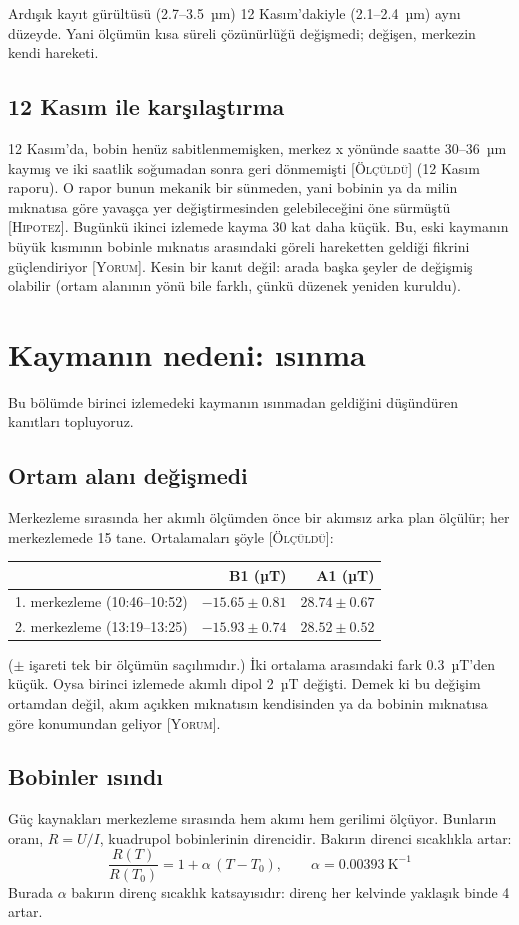 \documentclass[11pt,a4paper]{article}
\newcommand{\olc}{\textsc{[Ölçüldü]}}
\newcommand{\yor}{\textsc{[Yorum]}}
\newcommand{\hip}{\textsc{[Hipotez]}}
\begin{document}
Ardışık kayıt gürültüsü (2.7--3.5~µm) 12 Kasım'dakiyle (2.1--2.4~µm) aynı düzeyde. Yani ölçümün kısa
süreli çözünürlüğü değişmedi; değişen, merkezin kendi hareketi.

\subsection{12 Kasım ile karşılaştırma}
12 Kasım'da, bobin henüz sabitlenmemişken, merkez x yönünde saatte 30--36~µm kaymış ve iki saatlik soğumadan
sonra geri dönmemişti \olc{} (12 Kasım raporu). O rapor bunun mekanik bir sünmeden, yani bobinin ya da milin
mıknatısa göre yavaşça yer değiştirmesinden gelebileceğini öne sürmüştü \hip. Bugünkü ikinci izlemede kayma
30 kat daha küçük. Bu, eski kaymanın büyük kısmının bobinle mıknatıs arasındaki göreli hareketten geldiği
fikrini güçlendiriyor \yor. Kesin bir kanıt değil: arada başka şeyler de değişmiş olabilir (ortam alanının
yönü bile farklı, çünkü düzenek yeniden kuruldu).

\section{Kaymanın nedeni: ısınma}
\label{sec:isinma}

Bu bölümde birinci izlemedeki kaymanın ısınmadan geldiğini düşündüren kanıtları topluyoruz.

\subsection{Ortam alanı değişmedi}
Merkezleme sırasında her akımlı ölçümden önce bir akımsız arka plan ölçülür; her merkezlemede 15 tane.
Ortalamaları şöyle \olc:
\begin{center}\small
\begin{tabular}{lrr}
\toprule
 & B1 (µT) & A1 (µT) \\
\midrule
1. merkezleme (10:46--10:52) & $-15.65 \pm 0.81$ & $28.74 \pm 0.67$ \\
2. merkezleme (13:19--13:25) & $-15.93 \pm 0.74$ & $28.52 \pm 0.52$ \\
\bottomrule
\end{tabular}
\end{center}
($\pm$ işareti tek bir ölçümün saçılımıdır.) İki ortalama arasındaki fark 0.3~µT'den küçük. Oysa birinci
izlemede akımlı dipol 2~µT değişti. Demek ki bu değişim ortamdan değil, akım açıkken mıknatısın kendisinden
ya da bobinin mıknatısa göre konumundan geliyor \yor.

\subsection{Bobinler ısındı}
Güç kaynakları merkezleme sırasında hem akımı hem gerilimi ölçüyor. Bunların oranı, $R = U/I$, kuadrupol
bobinlerinin direncidir. Bakırın direnci sıcaklıkla artar:
\begin{equation}
  \frac{R(T)}{R(T_0)} = 1 + \alpha\,(T - T_0), \qquad \alpha = 0.00393\ \text{K}^{-1}
\end{equation}
Burada $\alpha$ bakırın direnç sıcaklık katsayısıdır: direnç her kelvinde yaklaşık binde 4 artar.
\end{document}
